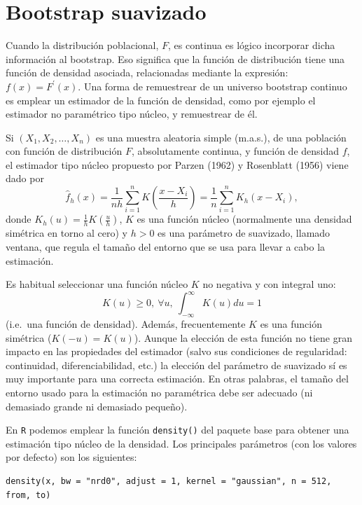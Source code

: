 \documentclass[
]{book}
\theoremstyle{break}
\theoremstyle{nonumberplain}
\begin{document}
\hypertarget{modunif-boot-suav}{%
\section{Bootstrap suavizado}\label{modunif-boot-suav}}

Cuando la distribución poblacional, \(F\), es continua es lógico incorporar dicha información al bootstrap.
Eso significa que la función de distribución tiene una función de densidad asociada, relacionadas mediante la expresión: \(f(x) =F^{\prime}(x)\).
Una forma de remuestrear de un universo bootstrap continuo es emplear un estimador de la función de densidad, como por ejemplo el estimador no paramétrico tipo núcleo, y remuestrear de él.

Si \(\left( X_1, X_2, \ldots, X_n \right)\) es una muestra aleatoria simple (m.a.s.), de una población con función de distribución \(F\), absolutamente continua, y función de densidad \(f\), el estimador tipo núcleo propuesto por Parzen (1962) y Rosenblatt (1956) viene dado por
\[\hat{f}_{h}\left( x \right) =\frac{1}{nh}\sum_{i=1}^{n}K\left( \frac{x-X_i}{h} \right) =\frac{1}{n}\sum_{i=1}^{n}K_{h}\left( x-X_i \right),\]
donde \(K_{h}\left( u \right) =\frac{1}{h}K\left( \frac{u}{h} \right)\), \(K\) es una función núcleo (normalmente una densidad simétrica en torno al cero) y \(h>0\) es una parámetro de suavizado, llamado ventana, que regula el tamaño del entorno que se usa para llevar a cabo la estimación.

Es habitual seleccionar una función núcleo \(K\) no negativa y con integral uno:
\[K\left( u \right) \geq 0,~\forall u,~\int_{-\infty }^{\infty }
K\left( u \right) du=1\]
(i.e.~una función de densidad).
Además, frecuentemente \(K\) es una función simétrica (\(K\left( -u \right) =K\left( u \right)\)).
Aunque la elección de esta función no tiene gran impacto en las propiedades del estimador (salvo sus condiciones de regularidad: continuidad, diferenciabilidad, etc.) la elección del parámetro de suavizado sí es muy importante para una correcta estimación.
En otras palabras, el tamaño del entorno usado para la estimación no paramétrica debe ser adecuado (ni demasiado grande ni demasiado pequeño).

En \texttt{R} podemos emplear la función \texttt{density()} del paquete base para obtener
una estimación tipo núcleo de la densidad.
Los principales parámetros (con los valores por defecto) son los siguientes:

\begin{verbatim}
density(x, bw = "nrd0", adjust = 1, kernel = "gaussian", n = 512, from, to)
\end{verbatim}
\end{document}
